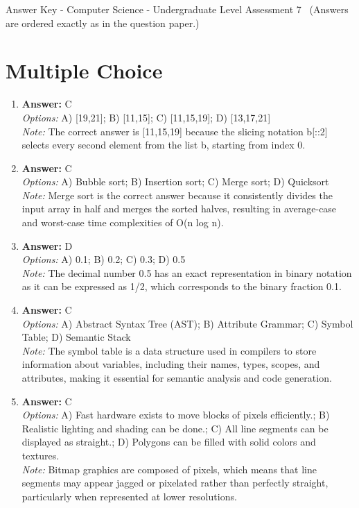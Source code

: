 \documentclass[12pt]{article}
\begin{document}
\begin{center}
Answer Key - Computer Science - Undergraduate Level Assessment 7 \
\small (Answers are ordered exactly as in the question paper.)
\end{center}

\section*{Multiple Choice}
\begin{enumerate}[label=\arabic*.]
\item \textbf{Answer:} C
\\ \textit{Options:} A) [19,21]; B) [11,15]; C) [11,15,19]; D) [13,17,21]
\\ \textit{Note:} The correct answer is [11,15,19] because the slicing notation b[::2] selects every second element from the list b, starting from index 0.
\item \textbf{Answer:} C
\\ \textit{Options:} A) Bubble sort; B) Insertion sort; C) Merge sort; D) Quicksort
\\ \textit{Note:} Merge sort is the correct answer because it consistently divides the input array in half and merges the sorted halves, resulting in average-case and worst-case time complexities of O(n log n).
\item \textbf{Answer:} D
\\ \textit{Options:} A) 0.1; B) 0.2; C) 0.3; D) 0.5
\\ \textit{Note:} The decimal number 0.5 has an exact representation in binary notation as it can be expressed as 1/2, which corresponds to the binary fraction 0.1.
\item \textbf{Answer:} C
\\ \textit{Options:} A) Abstract Syntax Tree (AST); B) Attribute Grammar; C) Symbol Table; D) Semantic Stack
\\ \textit{Note:} The symbol table is a data structure used in compilers to store information about variables, including their names, types, scopes, and attributes, making it essential for semantic analysis and code generation.
\item \textbf{Answer:} C
\\ \textit{Options:} A) Fast hardware exists to move blocks of pixels efficiently.; B) Realistic lighting and shading can be done.; C) All line segments can be displayed as straight.; D) Polygons can be filled with solid colors and textures.
\\ \textit{Note:} Bitmap graphics are composed of pixels, which means that line segments may appear jagged or pixelated rather than perfectly straight, particularly when represented at lower resolutions.
\end{enumerate}
\end{document}
